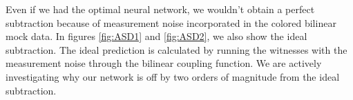 \begin{refsection}


Even if we had the optimal neural network, we wouldn't obtain a perfect subtraction because of measurement noise incorporated in the colored bilinear mock data. In figures \ref{fig:ASD1} and \ref{fig:ASD2}, we also show the ideal subtraction. The ideal prediction is calculated by running the witnesses with the measurement noise through the bilinear coupling function. We are actively investigating why our network is off by two orders of magnitude from the ideal subtraction.



\end{refsection}
